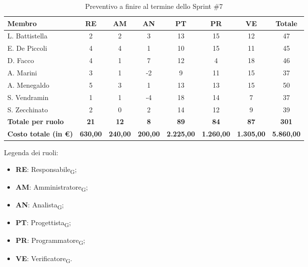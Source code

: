 \documentclass[a4paper, 10pt, colorlinks=true, linkcolor=black, urlcolor=blue, citecolor=blue, hidelinks]{article}
\renewcommand{\arraystretch}{1.2}
\begin{document}
\begin{table}[H]
    \centering
    \renewcommand{\arraystretch}{1.3}
    \begin{tabularx}{\textwidth}{|L|c|c|c|c|c|c|c|}
        \hline
        \textbf{Membro} & \textbf{RE} & \textbf{AM} & \textbf{AN} & \textbf{PT} & \textbf{PR} & \textbf{VE} & \textbf{Totale} \\
        \hline
        L. Battistella & 2 & 2 & 3 & 13 & 15 & 12 & 47 \\
        \hline
        E. De Piccoli & 4 & 4 & 1 & 10 & 15 & 11 & 45 \\
        \hline
        D. Facco & 4 & 1 & 7 & 12 & 4 & 18 & 46 \\
        \hline
        A. Marini & 3 & 1 & -2 & 9 & 11 & 15 & 37 \\
        \hline
        A. Menegaldo & 5 & 3 & 1 & 13 & 13 & 15 & 50 \\
        \hline
        S. Vendramin & 1 & 1 & -4 & 18 & 14 & 7 & 37 \\
        \hline
        S. Zecchinato & 2 & 0 & 2 & 14 & 12 & 9 & 39 \\
        \hline
        \textbf{Totale per ruolo} & \textbf{21} & \textbf{12} & \textbf{8} & \textbf{89} & \textbf{84} & \textbf{87} & \textbf{301} \\
        \hline
        \textbf{Costo totale (in €)} & \textbf{630,00} & \textbf{240,00} & \textbf{200,00} & \textbf{2.225,00} & \textbf{1.260,00} & \textbf{1.305,00} & \textbf{5.860,00} \\
        \hline
    \end{tabularx}
    \caption{Preventivo a finire al termine dello Sprint \#7}
\end{table}

\noindent
Legenda dei ruoli:
\begin{itemize}
    \item \textbf{RE}: Responsabile\textsubscript{G};
    \item \textbf{AM}: Amministratore\textsubscript{G};
    \item \textbf{AN}: Analista\textsubscript{G};
    \item \textbf{PT}: Progettista\textsubscript{G};
    \item \textbf{PR}: Programmatore\textsubscript{G};
    \item \textbf{VE}: Verificatore\textsubscript{G}.
\end{itemize}
\end{document}
